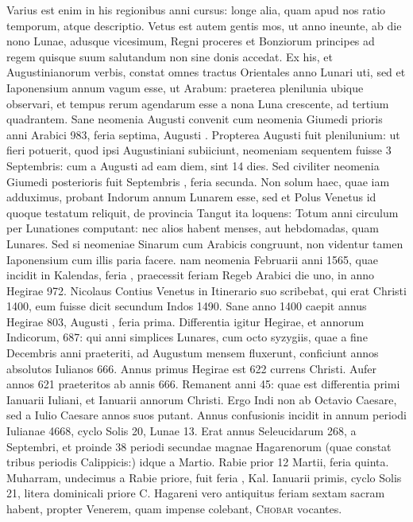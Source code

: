 Varius est enim in his regionibus
anni cursus: longe alia, quam apud nos ratio temporum, atque
descriptio.
Vetus est autem gentis mos, ut anno ineunte, ab die nono
Lunae, adusque vicesimum, Regni proceres et Bonziorum principes
ad regem quisque suum salutandum non sine donis accedat.
Ex his, et Augustinianorum verbis, constat omnes tractus Orientales
anno Lunari uti, sed et Iaponensium annum vagum esse, ut Arabum:
praeterea plenilunia ubique observari, et tempus rerum agendarum
esse a nona Luna crescente, ad tertium quadrantem.
Sane
neomenia Augusti convenit cum neomenia Giumedi prioris anni
Arabici 983, feria septima, Augusti .
Propterea  Augusti fuit
plenilunium: ut fieri potuerit, quod ipsi Augustiniani subiiciunt,
neomeniam sequentem fuisse 3 Septembris: cum a  Augusti ad
eam diem, sint 14 dies.
Sed civiliter neomenia Giumedi posterioris
fuit Septembris , feria secunda.
Non solum haec, quae iam adduximus,
probant Indorum annum Lunarem esse, sed et Polus Venetus
id quoque testatum reliquit, de provincia Tangut ita loquens:
Totum anni circulum per Lunationes computant: nec alios habent
menses, aut hebdomadas, quam Lunares.
Sed si neomeniae Sinarum
cum Arabicis congruunt, non videntur tamen Iaponensium cum illis
paria facere.
nam neomenia Februarii anni 1565, quae incidit in
Kalendas, feria , praecessit feriam Regeb Arabici die uno, in anno
Hegirae 972.
Nicolaus Contius Venetus in Itinerario suo scribebat, qui
erat Christi 1400, eum fuisse dicit secundum Indos 1490.
Sane anno
1400 caepit annus Hegirae 803, Augusti , feria prima.
Differentia
igitur Hegirae, et annorum Indicorum, 687: qui anni simplices Lunares,
cum octo syzygiis, quae a fine Decembris anni praeteriti, ad Augustum
mensem fluxerunt, conficiunt annos absolutos Iulianos 666.
Annus
primus Hegirae est 622 currens Christi.
Aufer annos 621 praeteritos %
ab annis 666.
Remanent anni 45: quae est differentia primi Ianuarii
Iuliani, et Ianuarii annorum Christi.
Ergo Indi non ab Octavio
Caesare, sed a Iulio Caesare annos suos putant.
Annus confusionis
incidit in annum periodi Iulianae 4668, cyclo Solis 20, Lunae 13.
Erat annus Seleucidarum 268, a Septembri, et proinde 38 periodi
secundae magnae Hagarenorum (quae constat tribus periodis Calippicis:)
idque a Martio.
Rabie prior 12 Martii, feria quinta.
Muharram,
undecimus a Rabie priore, fuit feria , Kal. %
 Ianuarii primis,
cyclo Solis 21, litera dominicali priore C.
Hagareni vero antiquitus
feriam sextam sacram habent, propter Venerem, quam impense
colebant, \textsc{Chobar} vocantes.

